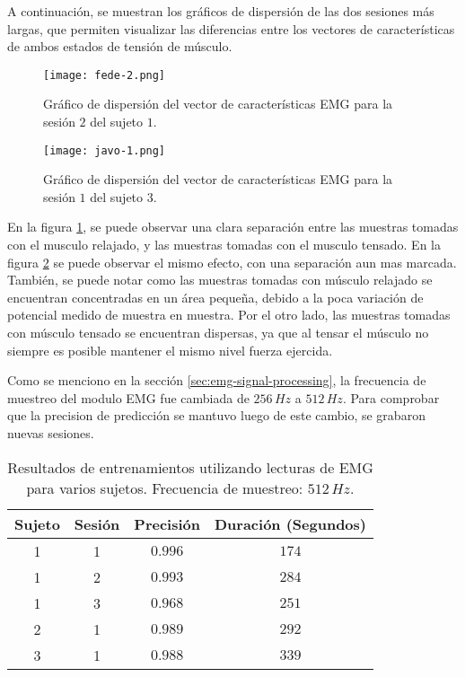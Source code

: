 A continuación, se muestran los gráficos de dispersión de las dos sesiones más largas, que permiten visualizar las diferencias entre los vectores de características de ambos estados de tensión de músculo.

 \begin{figure}[H]
	\centering
    \texttt{[image: fede-2.png]}
    \caption{Gráfico de dispersión del vector de características EMG para la sesión $2$ del sujeto $1$.}
	\label{fig:emg-graph-s1s2}
\end{figure}

 \begin{figure}[H]
	\centering
    \texttt{[image: javo-1.png]}
    \caption{Gráfico de dispersión del vector de características EMG para la sesión $1$ del sujeto $3$.}
	\label{fig:emg-graph-s3s1}
\end{figure}

En la figura \ref{fig:emg-graph-s1s2}, se puede observar una clara separación entre las muestras tomadas con el musculo relajado, y las muestras tomadas con el musculo tensado. En la figura \ref{fig:emg-graph-s3s1} se puede observar el mismo efecto, con una separación aun mas marcada. También, se puede notar como las muestras tomadas con músculo relajado se encuentran concentradas en un área pequeña, debido a la poca variación de potencial medido de muestra en muestra. Por el otro lado, las muestras tomadas con músculo tensado se encuentran dispersas, ya que al tensar el músculo no siempre es posible mantener el mismo nivel fuerza ejercida.

Como se menciono en la sección \ref{sec:emg-signal-processing}, la frecuencia de muestreo del modulo EMG fue cambiada de $256\,Hz$ a $512\,Hz$. Para comprobar que la precision de predicción se mantuvo luego de este cambio, se grabaron nuevas sesiones.

\begin{table}[H]
\centering
\begin{tabular}{ |c|c|c|c| } 
 \hline
 Sujeto & Sesión & Precisión & Duración (Segundos) \\ 
 \hline
 1 & 1 & $0.996$ & $174$ \\
 \hline
 1 & 2 & $0.993$ & $284$ \\
 \hline
 1 & 3 & $0.968$ & $251$ \\
 \hline
 2 & 1 & $0.989$ & $292$ \\
 \hline
 3 & 1 & $0.988$ & $339$ \\

 \hline
\end{tabular}
\caption{Resultados de entrenamientos utilizando lecturas de EMG para varios sujetos. Frecuencia de muestreo: $512\,Hz$.}
\label{tab:emg-results-512}
\end{table}

